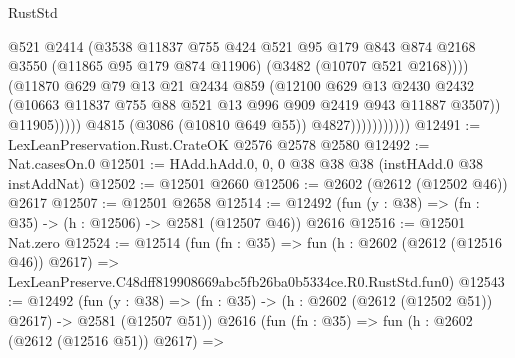 \begin{lexlean}{RustStd}
\begin{coremodule}
                                    @521
                                    @2414
                                    (@3538
                                      @11837
                                      @755
                                      @424
                                      @521
                                      @95
                                      @179
                                      @843
                                      @874
                                      @2168
                                      @3550
                                      (@11865 @95 @179 @874 @11906)
                                      (@3482 (@10707 @521 @2168))))
                                  (@11870
                                    @629
                                    @79
                                    @13
                                    @21
                                    @2434
                                    @859
                                    (@12100
                                      @629
                                      @13
                                      @2430
                                      @2432
                                      (@10663
                                        @11837
                                        @755
                                        @88
                                        @521
                                        @13
                                        @996
                                        @909
                                        @2419
                                        @943
                                        @11887
                                        @3507))
                                    @11905)))))
                          @4815
                          (@3086 (@10810 @649 @55))
                          @4827)))))))))))
@12491 := LexLeanPreservation.Rust.CrateOK @2576 @2578 @2580
@12492 := Nat.casesOn.{0}
@12501 := HAdd.hAdd.{0, 0, 0} @38 @38 @38 (instHAdd.{0} @38 instAddNat)
@12502 := @12501 @2660
@12506 := @2602 (@2612 (@12502 @46)) @2617
@12507 := @12501 @2658
@12514 := @12492 (fun (y : @38) => (fn : @35) -> (h : @12506) -> @2581 (@12507 @46)) @2616
@12516 := @12501 Nat.zero
@12524 := @12514
    (fun (fn : @35) =>
    fun (h : @2602 (@2612 (@12516 @46)) @2617) =>
    LexLeanPreserve.C48dff819908669abc5fb26ba0b5334ce.R0.RustStd.fun0)
@12543 := @12492
    (fun (y : @38) => (fn : @35) -> (h : @2602 (@2612 (@12502 @51)) @2617) -> @2581 (@12507 @51))
    @2616
    (fun (fn : @35) =>
    fun (h : @2602 (@2612 (@12516 @51)) @2617) =>

\end{coremodule}
\end{lexlean}
